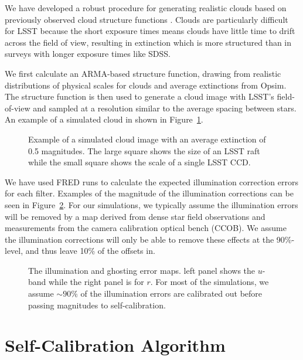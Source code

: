 \documentclass[12pt,preprint]{aastex}
\begin{document}
We have developed a robust procedure for generating realistic clouds based on previously observed cloud structure functions \citep{Ivezic2007,Burke2010}. Clouds are particularly difficult for LSST because the short exposure times means clouds have little time to drift across the field of view, resulting in extinction which is more structured than in surveys with longer exposure times like SDSS.  

We first calculate an ARMA-based structure function, drawing from realistic distributions of physical scales for clouds and average extinctions from Opsim.  The structure function is then used to generate a cloud image with LSST's field-of-view and sampled at a resolution similar to the average spacing between stars.  An example of a simulated cloud in shown in Figure~\ref{fig:cloud}.  


\begin{figure}
\caption{Example of a simulated cloud image with an average extinction of 0.5 magnitudes.  The large square shows the size of an LSST raft while the small square shows the scale of a single LSST CCD.  \label{fig:cloud}}
\end{figure}

We have used FRED runs to calculate the expected illumination correction errors for each filter.  Examples of the magnitude of the illumination corrections can be seen in Figure~\ref{fig:illum}.  For our simulations, we typically assume the illumination errors will be removed by a map derived from dense star field observations and measurements from the camera calibration optical bench (CCOB).  We assume the illumination corrections will only be able to remove these effects at the 90\%-level, and thus leave 10\% of the offsets in.  

\begin{figure}
\caption{The illumination and ghosting error maps.  left panel shows
the $u$-band while the right panel is for $r$. For most of the simulations, we assume $\sim90$\% of the illumination errors are calibrated out before passing magnitudes to self-calibration.  \label{fig:illum}}
\end{figure}


\section{Self-Calibration Algorithm}\label{alg}
\end{document}
